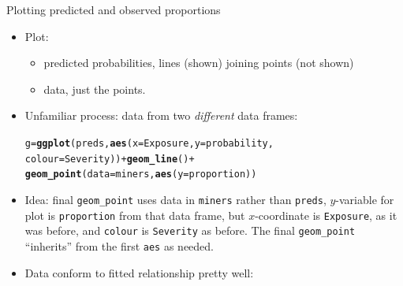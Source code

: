 \documentclass[unknownkeysallowed]{beamer}\usepackage[]{graphicx}\usepackage[]{color}
\makeatletter
\newcommand{\hlopt}[1]{\textcolor[rgb]{0,0,0}{#1}}%
\newcommand{\hlstd}[1]{\textcolor[rgb]{0.345,0.345,0.345}{#1}}%
\newcommand{\hlkwb}[1]{\textcolor[rgb]{0.69,0.353,0.396}{#1}}%
\newcommand{\hlkwc}[1]{\textcolor[rgb]{0.333,0.667,0.333}{#1}}%
\newcommand{\hlkwd}[1]{\textcolor[rgb]{0.737,0.353,0.396}{\textbf{#1}}}%
\newenvironment{kframe}{%
 \def\at@end@of@kframe{}%
 \ifinner\ifhmode%
  \def\at@end@of@kframe{\end{minipage}}%
  \begin{minipage}{\columnwidth}%
 \fi\fi%
 \def\FrameCommand##1{\hskip\@totalleftmargin \hskip-\fboxsep
 \colorbox{shadecolor}{##1}\hskip-\fboxsep
     \hskip-\linewidth \hskip-\@totalleftmargin \hskip\columnwidth}%
 \MakeFramed {\advance\hsize-\width
   \@totalleftmargin\z@ \linewidth\hsize
   \@setminipage}}%
 {\par\unskip\endMakeFramed%
 \at@end@of@kframe}
\newenvironment{knitrout}{}{} %
\makeatother
\begin{document}
\begin{frame}[fragile]{Plotting predicted and observed proportions}
  
  \begin{itemize}
    \item Plot:
      \begin{itemize}
      \item  predicted probabilities, lines (shown) joining points (not shown)
      \item data, just the points. 
      \end{itemize}
  
  \item Unfamiliar process: data from two \emph{different} data frames:
  
\begin{knitrout}
\color{fgcolor}\begin{kframe}
\begin{alltt}
\hlstd{g}\hlkwb{=}\hlkwd{ggplot}\hlstd{(preds,}\hlkwd{aes}\hlstd{(}\hlkwc{x}\hlstd{=Exposure,}\hlkwc{y}\hlstd{=probability,}
    \hlkwc{colour}\hlstd{=Severity))} \hlopt{+} \hlkwd{geom_line}\hlstd{()} \hlopt{+}
  \hlkwd{geom_point}\hlstd{(}\hlkwc{data}\hlstd{=miners,}\hlkwd{aes}\hlstd{(}\hlkwc{y}\hlstd{=proportion))}
\end{alltt}
\end{kframe}
\end{knitrout}

\item Idea: final \texttt{geom\_point} uses data in \texttt{miners}
  rather than \texttt{preds}, $y$-variable for plot is \texttt{proportion}
  from that data frame, but $x$-coordinate is \texttt{Exposure}, as it
  was before, and \texttt{colour} is \texttt{Severity} as before. The
  final \texttt{geom\_point} ``inherits'' from the first \texttt{aes}
  as needed.
\item Data conform to fitted relationship pretty well:
  \end{itemize}
  
\end{frame}
\end{document}
